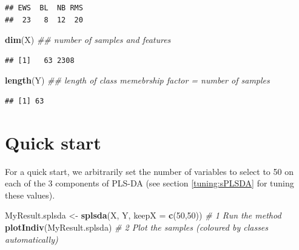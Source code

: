 \documentclass[]{book}
\newenvironment{Shaded}{\begin{snugshade}}{\end{snugshade}}
\newcommand{\CommentTok}[1]{\textcolor[rgb]{0.56,0.35,0.01}{\textit{#1}}}
\newcommand{\DataTypeTok}[1]{\textcolor[rgb]{0.13,0.29,0.53}{#1}}
\newcommand{\DecValTok}[1]{\textcolor[rgb]{0.00,0.00,0.81}{#1}}
\newcommand{\KeywordTok}[1]{\textcolor[rgb]{0.13,0.29,0.53}{\textbf{#1}}}
\newcommand{\NormalTok}[1]{#1}
\newcommand{\StringTok}[1]{\textcolor[rgb]{0.31,0.60,0.02}{#1}}
\begin{document}
\begin{verbatim}
## EWS  BL  NB RMS 
##  23   8  12  20
\end{verbatim}

\begin{Shaded}
\begin{Highlighting}[]
\KeywordTok{dim}\NormalTok{(X) }\CommentTok{## number of samples and features}
\end{Highlighting}
\end{Shaded}

\begin{verbatim}
## [1]   63 2308
\end{verbatim}

\begin{Shaded}
\begin{Highlighting}[]
\KeywordTok{length}\NormalTok{(Y) }\CommentTok{## length of class memebrship factor = number of samples}
\end{Highlighting}
\end{Shaded}

\begin{verbatim}
## [1] 63
\end{verbatim}

\hypertarget{quick-start-1}{%
\section{Quick start}\label{quick-start-1}}

For a quick start, we arbitrarily set the number of variables to select to 50 on each of the 3 components of PLS-DA (see section \ref{tuning:sPLSDA} for tuning these values).

\begin{Shaded}
\begin{Highlighting}[]
\NormalTok{MyResult.splsda <-}\StringTok{ }\KeywordTok{splsda}\NormalTok{(X, Y, }\DataTypeTok{keepX =} \KeywordTok{c}\NormalTok{(}\DecValTok{50}\NormalTok{,}\DecValTok{50}\NormalTok{)) }\CommentTok{# 1 Run the method}
\KeywordTok{plotIndiv}\NormalTok{(MyResult.splsda)                          }\CommentTok{# 2 Plot the samples (coloured by classes automatically)}
\end{Highlighting}
\end{Shaded}
\end{document}
